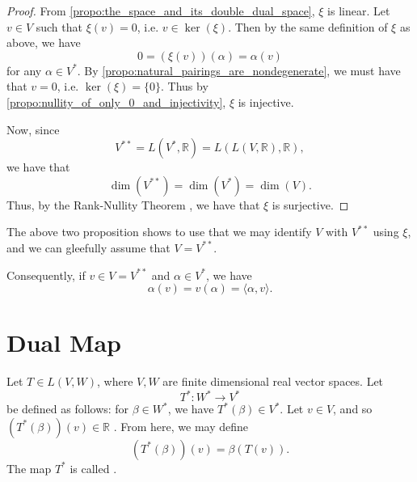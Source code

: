 \documentclass[notoc,notitlepage]{tufte-book}
\begin{document}
\begin{proof}
  From \cref{propo:the_space_and_its_double_dual_space}, $\xi$ is linear.
  Let $v \in V$ such that $\xi(v) = 0$, i.e. $v \in \ker(\xi)$.
  Then by the same definition of $\xi$ as above, we have
  \begin{equation*}
    0 = (\xi(v))(\alpha) = \alpha(v)
  \end{equation*}
  for any $\alpha \in V^*$.
  By \cref{propo:natural_pairings_are_nondegenerate}, we must have that $v = 0$,
  i.e. $\ker(\xi) = \{ 0 \}$.
  Thus by \cref{propo:nullity_of_only_0_and_injectivity}, $\xi$ is injective.

  Now, since
  \begin{equation*}
    V^{**} = L(V^*, \mathbb{R}) = L ( L ( V, \mathbb{R} ), \mathbb{R} ),
  \end{equation*}
  we have that
  \begin{equation*}
    \dim(V^{**}) = \dim(V^*) = \dim(V).
  \end{equation*}
  Thus, by the Rank-Nullity Theorem
  ,
  we have that $\xi$ is surjective.

  
\end{proof}

The above two proposition shows to use that we may
identify $V$ with $V^{**}$ using $\xi$, and we can
gleefully assume that $V = V^{**}$.

Consequently, if $v \in V = V^{**}$ and $\alpha \in V^*$,
we have
\begin{equation}\label{eq:commutativity_of_the_vector_and_its_linear_operator}
  \alpha(v) = v(\alpha) = \langle \alpha, v \rangle.
\end{equation}


\section{Dual Map}%
\label{sec:dual_map}

\begin{defn}\label{defn:dual_map}
  Let $T \in L(V, W)$, where $V, W$ are finite dimensional real vector spaces. Let
  \begin{equation*}
    T^* : W^* \to V^*
  \end{equation*}
  be defined as follows: for $\beta \in W^*$, we have $T^*(\beta) \in V^*$.
  Let $v \in V$, and so $(T^*(\beta))(v) \in \mathbb{R}$
  .
  From here, we may define
  \begin{equation*}
    (T^*(\beta))(v) = \beta(T(v)).
  \end{equation*}
  The map $T^*$ is called .
\end{defn}
\end{document}
